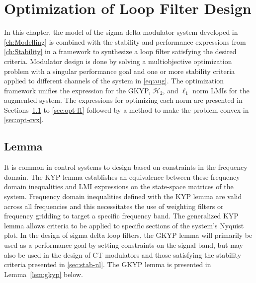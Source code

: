 
\chapter{Optimization of Loop Filter Design}
\label{ch:Optimization}

In this chapter, the model of the sigma delta modulator system developed in \autoref{ch:Modelling} is combined with the stability and performance expressions from \autoref{ch:Stability} in a framework to synthesize a loop filter satisfying the desired criteria. Modulator design is done by solving a multiobjective optimization problem with a singular performance goal and one or more stability criteria applied to different channels of the system in \autoref{eq:aug}. The optimization framework unifies the expression for the \gls{GKYP}, $\mathcal{H}_2$, and $\ell_1$ norm \gls{LMI}s for the augmented system. The expressions for optimizing each norm are presented in Sections~\ref{sec:opt-gkyp} to \ref{sec:opt-l1} followed by a method to make the problem convex in \autoref{sec:opt-cvx}.

\section{ Lemma}
\label{sec:opt-gkyp}

It is common in control systems to design based on constraints in the frequency domain. The KYP lemma establishes an equivalence between these frequency domain inequalities and \gls{LMI} expressions on the state-space matrices of the system. Frequency domain inequalities defined with the KYP lemma are valid across all frequencies and this necessitates the use of weighting filters or frequency gridding to target a specific frequency band. The generalized KYP lemma allows criteria to be applied to specific sections of the system's Nyquist plot. In the design of sigma delta loop filters, the \gls{GKYP} lemma will primarily be used as a performance goal by setting constraints on the signal band, but may also be used in the design of \gls{CT} modulators and those satisfying the stability criteria presented in \autoref{sec:stab-nl}. The \gls{GKYP} lemma is presented in Lemma~\ref{lem:gkyp} below.

